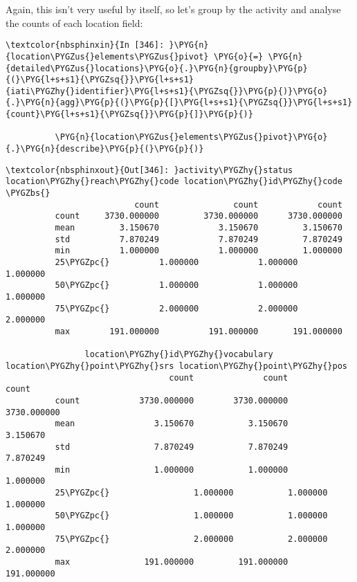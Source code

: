 \documentclass[letterpaper,10pt,english]{sphinxmanual}
\begin{document}
Again, this isn't very useful by itself, so let's group by the activity
and analyse the counts of each location field:

\begin{Verbatim}[commandchars=\\\{\}]
\textcolor{nbsphinxin}{In [346]: }\PYG{n}{location\PYGZus{}elements\PYGZus{}pivot} \PYG{o}{=} \PYG{n}{detailed\PYGZus{}locations}\PYG{o}{.}\PYG{n}{groupby}\PYG{p}{(}\PYG{l+s+s1}{\PYGZsq{}}\PYG{l+s+s1}{iati\PYGZhy{}identifier}\PYG{l+s+s1}{\PYGZsq{}}\PYG{p}{)}\PYG{o}{.}\PYG{n}{agg}\PYG{p}{(}\PYG{p}{[}\PYG{l+s+s1}{\PYGZsq{}}\PYG{l+s+s1}{count}\PYG{l+s+s1}{\PYGZsq{}}\PYG{p}{]}\PYG{p}{)}
          
          \PYG{n}{location\PYGZus{}elements\PYGZus{}pivot}\PYG{o}{.}\PYG{n}{describe}\PYG{p}{(}\PYG{p}{)}
\end{Verbatim}

\begin{Verbatim}[commandchars=\\\{\}]
\textcolor{nbsphinxout}{Out[346]: }activity\PYGZhy{}status location\PYGZhy{}reach\PYGZhy{}code location\PYGZhy{}id\PYGZhy{}code  \PYGZbs{}
                          count               count            count
          count     3730.000000         3730.000000      3730.000000
          mean         3.150670            3.150670         3.150670
          std          7.870249            7.870249         7.870249
          min          1.000000            1.000000         1.000000
          25\PYGZpc{}          1.000000            1.000000         1.000000
          50\PYGZpc{}          1.000000            1.000000         1.000000
          75\PYGZpc{}          2.000000            2.000000         2.000000
          max        191.000000          191.000000       191.000000
          
                location\PYGZhy{}id\PYGZhy{}vocabulary location\PYGZhy{}point\PYGZhy{}srs location\PYGZhy{}point\PYGZhy{}pos
                                 count              count              count
          count            3730.000000        3730.000000        3730.000000
          mean                3.150670           3.150670           3.150670
          std                 7.870249           7.870249           7.870249
          min                 1.000000           1.000000           1.000000
          25\PYGZpc{}                 1.000000           1.000000           1.000000
          50\PYGZpc{}                 1.000000           1.000000           1.000000
          75\PYGZpc{}                 2.000000           2.000000           2.000000
          max               191.000000         191.000000         191.000000
\end{Verbatim}
\end{document}
